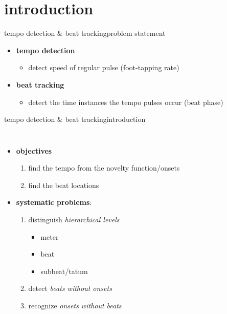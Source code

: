     \section[intro]{introduction}
        \begin{frame}{tempo detection \& beat tracking}{problem statement}
            \begin{itemize}
                \item   \textbf{tempo detection}
                    \begin{itemize}
                        \item   detect speed of regular pulse (foot-tapping rate)
                    \end{itemize}
                \bigskip
                \item   \textbf{beat tracking}
                    \begin{itemize}
                        \item   detect the time instances the tempo pulses occur (beat phase)
                    \end{itemize}
            \end{itemize}
        \end{frame}
        
       \begin{frame}{tempo detection \& beat tracking}{introduction}
            \begin{columns}
            \begin{itemize}
                \item \textbf{objectives}
                    \begin{enumerate}
                        \item	find the tempo from the novelty function/onsets
                        \item	find the beat locations
                    \end{enumerate}
                \bigskip
                \item \textbf{systematic problems}:
                    \begin{enumerate}
                        \item	distinguish \textit{hierarchical levels}
                            \begin{itemize}
                                \item	meter
                                \item	beat
                                \item	subbeat/tatum
                            \end{itemize}
                        \item<1->	detect \textit{beats without onsets}
                        \item<1->	recognize \textit{onsets without beats}
                    \end{enumerate}
            \end{itemize}
            \end{columns}
        \end{frame}
        
